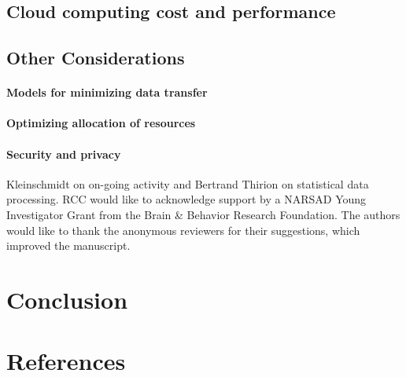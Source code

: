 \documentclass[1p,11pt]{elsarticle}
\begin{document}
\subsection{Cloud computing cost and performance}
\subsection{Other Considerations}
\paragraph{Models for minimizing data transfer}
\paragraph{Optimizing allocation of resources}
\paragraph{Security and privacy}

Kleinschmidt on on-going activity and Bertrand Thirion on statistical
data processing. RCC would like to acknowledge support by a NARSAD Young
Investigator Grant from the Brain \& Behavior Research Foundation.  The
authors would like to thank the anonymous reviewers for their
suggestions, which improved the manuscript.

\section{Conclusion}


{
\section*{References} \small
%
  }

\end{document}
